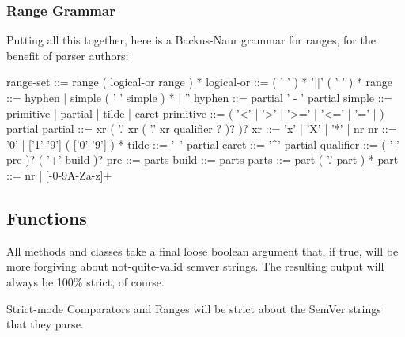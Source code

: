 \subsubsection*{Range Grammar}

Putting all this together, here is a Backus-\/\+Naur grammar for ranges, for the benefit of parser authors\+:


\begin{DoxyCode}
range-set  ::= range ( logical-or range ) *
logical-or ::= ( ' ' ) * '||' ( ' ' ) *
range      ::= hyphen | simple ( ' ' simple ) * | ''
hyphen     ::= partial ' - ' partial
simple     ::= primitive | partial | tilde | caret
primitive  ::= ( '<' | '>' | '>=' | '<=' | '=' | ) partial
partial    ::= xr ( '.' xr ( '.' xr qualifier ? )? )?
xr         ::= 'x' | 'X' | '*' | nr
nr         ::= '0' | ['1'-'9'] ( ['0'-'9'] ) *
tilde      ::= '~' partial
caret      ::= '^' partial
qualifier  ::= ( '-' pre )? ( '+' build )?
pre        ::= parts
build      ::= parts
parts      ::= part ( '.' part ) *
part       ::= nr | [-0-9A-Za-z]+
\end{DoxyCode}


\subsection*{Functions}

All methods and classes take a final {\ttfamily loose} boolean argument that, if true, will be more forgiving about not-\/quite-\/valid semver strings. The resulting output will always be 100\% strict, of course.

Strict-\/mode Comparators and Ranges will be strict about the Sem\+Ver strings that they parse.


